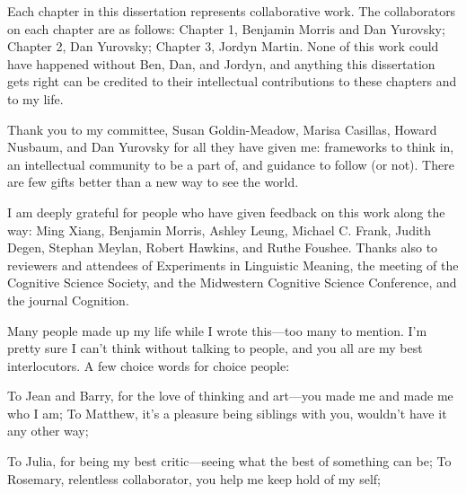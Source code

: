 \documentclass{ucetd}
\date{August 2023}
\title{\thesistitle}
\author{\thesisauthor}
\begin{document}
\maketitle

\makecopyright


\newpage
{}
\tableofcontents
{}
\newpage
{}
\listoffigures
\newpage
{}
\listoftables
\newpage

\acknowledgments
Each chapter in this dissertation represents collaborative work. The collaborators on each chapter are as follows: Chapter 1, Benjamin Morris and Dan Yurovsky; Chapter 2, Dan Yurovsky; Chapter 3, Jordyn Martin. None of this work could have happened without Ben, Dan, and Jordyn, and anything this dissertation gets right can be credited to their intellectual contributions to these chapters and to my life.

Thank you to my committee, Susan Goldin-Meadow, Marisa Casillas, Howard Nusbaum, and Dan Yurovsky for all they have given me: frameworks to think in, an intellectual community to be a part of, and guidance to follow (or not). There are few gifts better than a new way to see the world.

I am deeply grateful for people who have given feedback on this work along the way: Ming Xiang, Benjamin Morris, Ashley Leung, Michael C. Frank, Judith Degen, Stephan Meylan, Robert Hawkins, and Ruthe Foushee. Thanks also to reviewers and attendees of Experiments in Linguistic Meaning, the meeting of the Cognitive Science Society, and the Midwestern Cognitive Science Conference, and the journal Cognition.

Many people made up my life while I wrote this—too many to mention. I'm pretty sure I can't think without talking to people, and you all are my best interlocutors. A few choice words for choice people:

To Jean and Barry, for the love of thinking and art—you made me and made me who I am; To Matthew, it's a pleasure being siblings with you, wouldn't have it any other way;

To Julia, for being my best critic—seeing what the best of something can be; To Rosemary, relentless collaborator, you help me keep hold of my self;
\end{document}
